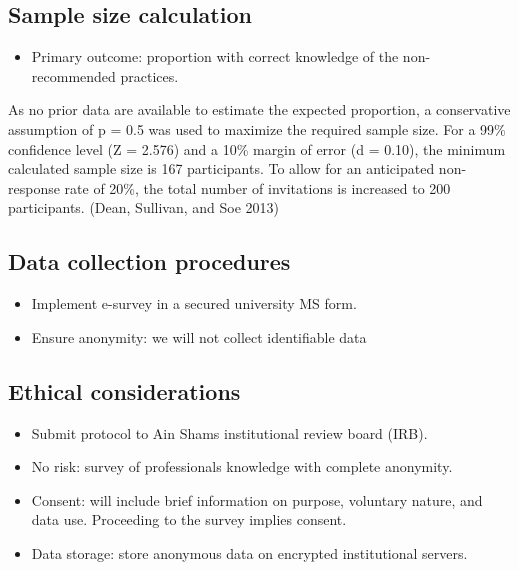 \documentclass[
  letterpaper,
  DIV=11,
  numbers=noendperiod]{scrartcl}
\providecommand{\tightlist}{%
  \setlength{\itemsep}{0pt}\setlength{\parskip}{0pt}}
\begin{document}
\subsection{Sample size calculation}\label{sample-size-calculation}

\begin{itemize}
\tightlist
\item
  Primary outcome: proportion with correct knowledge of the
  non-recommended practices.
\end{itemize}

As no prior data are available to estimate the expected proportion, a
conservative assumption of p = 0.5 was used to maximize the required
sample size. For a 99\% confidence level (Z = 2.576) and a 10\% margin
of error (d = 0.10), the minimum calculated sample size is 167
participants. To allow for an anticipated non-response rate of 20\%, the
total number of invitations is increased to 200 participants. (Dean,
Sullivan, and Soe 2013)

\subsection{Data collection
procedures}\label{data-collection-procedures}

\begin{itemize}
\item
  Implement e-survey in a secured university MS form.
\item
  Ensure anonymity: we will not collect identifiable data
\end{itemize}

\subsection{Ethical considerations}\label{ethical-considerations}

\begin{itemize}
\item
  Submit protocol to Ain Shams institutional review board (IRB).
\item
  No risk: survey of professionals knowledge with complete anonymity.
\item
  Consent: will include brief information on purpose, voluntary nature,
  and data use. Proceeding to the survey implies consent.
\item
  Data storage: store anonymous data on encrypted institutional servers.
\end{itemize}
\end{document}
